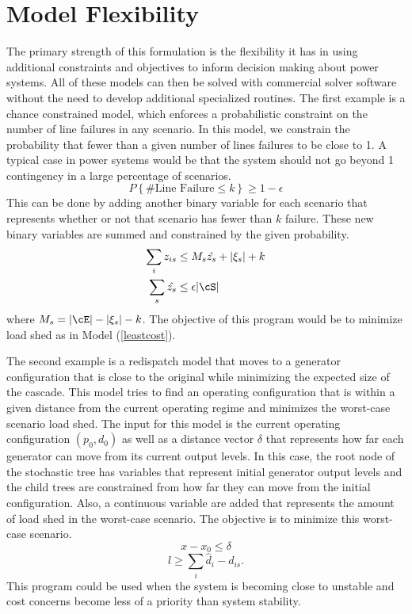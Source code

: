 \section{Model Flexibility}
The primary strength of this formulation is the flexibility it has in using additional constraints and objectives to inform decision making about power systems.  All of these models can then be solved with commercial solver software without the need to develop additional specialized routines.  The first example is a chance constrained model, which enforces a probabilistic constraint on the number of line failures in any scenario. 
In this model, we constrain the probability that fewer than a given number of lines failures to be close to 1.  A typical case in power systems would be that the system should not go beyond 1 contingency in a large percentage of scenarios.
\begin{equation}
P\left\{\text{\# Line Failure} \le k \right\} \ge 1 - \epsilon
\end{equation}
This can be done by adding another binary variable for each scenario that represents whether or not that scenario has fewer than $k$ failure.  These new binary variables are summed and constrained by the given probability.
\begin{subequations}
\begin{align}
\sum_i z_{is} &\le	M_s \hat{z_s} + | \xi_s | + k \\
\sum_s \hat{z_s} &\le \epsilon | \cS |
\end{align}
\end{subequations}
where $M_s = | \cE | - | \xi_s | - k$.  The objective of this program would be to minimize load shed as in Model (\ref{leastcost}).


The second example is a redispatch model that moves to a generator configuration that is close to the original while minimizing the expected size of the cascade.
This model tries to find an operating configuration that is within a given distance from the current operating regime and minimizes the worst-case scenario load shed.  The input for this model is the current operating configuration $(p_0, d_0)$ as well as a distance vector $\delta$ that represents how far each generator can move from its current output levels.  In this case, the root node of the stochastic tree has variables that represent initial generator output levels and the child trees are constrained from how far they can move from the initial configuration.  Also, a continuous variable are added that represents the amount of load shed in the worst-case scenario.  The objective is to minimize this worst-case scenario.  
\begin{equation}
x - x_0 \le \delta
\end{equation}
\begin{equation}
l \ge \sum_i \hat{d}_i - d_{is}.
\end{equation}
This program could be used when the system is becoming close to unstable and cost concerns become less of a priority than system stability.


